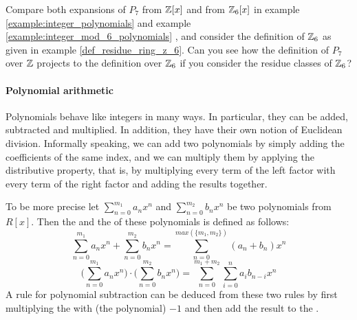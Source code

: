 \begin{exercise}
Compare both expansions of $P_7$ from $\mathbb{Z}[x]$ and from $\mathbb{Z}_6[x]$ in example \ref{example:integer_polynomials} and example \ref{example:integer_mod_6_polynomials} , and consider the definition of $\mathbb{Z}_6$ as given in example \ref{def_residue_ring_z_6}. Can you see how the definition of $P_7$ over $\mathbb{Z}$ projects to the definition over $\mathbb{Z}_6$ if you consider the residue classes of $\mathbb{Z}_6$?
\end{exercise}
\paragraph{Polynomial arithmetic}
Polynomials behave like integers in many ways. In particular, they can be added, subtracted and multiplied. In addition, they have their own notion of Euclidean division. Informally speaking, we can add two polynomials  by simply adding the coefficients of the same index, and we can multiply them by applying the distributive property, that is, by multiplying every term of the left factor with every term of the right factor and adding the results together.

To be more precise let $ \sum _{n = 0} ^{m_1}{a} _{n}{x} ^{n} $ and
$ \sum _{n = 0} ^{m_2}{b} _{n}{x^n} $ be two polynomials from $ R[x]$. Then the  and the  of these polynomials is defined as follows:
\begin{equation}
\label{def:polynomial_arithmetic}
\sum _{n = 0} ^{m_1}{a} _{n}{x} ^{n} + \sum _{n = 0} ^{m_2}{b} _{n}{x } ^{n} = \sum _{n = 0} ^{max(\{m_1,m_2\})}{({a} _{n} +{b} _{n})}{x} ^{n}
\end{equation}
\begin{equation}
\label{def:polynomial_arithmetic_mul}
\bigg (\sum _{n = 0} ^{m_1}{a} _{n}{x} ^{n} \bigg) \cdot \bigg (\sum _{n = 0} ^{m_2 }{b} _{n}{x} ^{n} \bigg) = \sum _{n = 0} ^{m_1+m_2} \sum _{i = 0} ^{n}{a} _{i }{{b} _{n-i}}{x} ^{n}
\end{equation}
A rule for polynomial subtraction can be deduced from these two rules by first multiplying the \href{https://www.splashlearn.com/math-vocabulary/subtraction/subtrahend}{}
with (the polynomial) $-1$ and then add the result to the \href{https://www.splashlearn.com/math-vocabulary/subtraction/minuend}{}.

